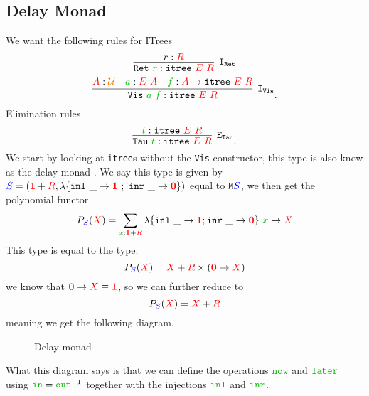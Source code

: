 \documentclass[twoside,11pt,openright]{report}
\newcommand*{\term}[1]{\textcolor{green!70!black}{#1}}
\newcommand*{\type}[1]{\textcolor{red}{#1}}
\newcommand*{\container}[1]{\textcolor{blue}{#1}}
\newcommand*{\universe}[1]{\textcolor{orange}{#1}}
\newcommand*{\unit}{\type{\textbf{1}}}
\newcommand*{\empt}{\type{\textbf{0}}}
\begin{document}
\subsection{Delay Monad}
We want the following rules for ITrees
\begin{equation}
  \infer [\mathtt{I}_\mathtt{Ret}]{\mathtt{Ret}~\term{r} : \mathtt{itree}~\type{E}~\type{R}}{r : \type{R}}
\end{equation}
\begin{equation}
  \infer[\mathtt{I}_\mathtt{Vis}]{\mathtt{Vis}~\term{a}~\term{f} : \mathtt{itree}~\type{E}~\type{R}}{\type{A} : \universe{\mathcal{U}} & \term{a} : \type{E}~\type{A} & \term{f} : \type{A} \rightarrow \texttt{itree}~\type{E}~\type{R}}.
\end{equation}
Elimination rules
\begin{equation}
  \infer[\mathtt{E}_\mathtt{Tau}]{\mathtt{Tau}~\term{t} : \mathtt{itree}~\type{E}~\type{R}}{\term{t} : \mathtt{itree}~\type{E}~\type{R}}.
\end{equation}
We start by looking at \texttt{itree}s without the \texttt{Vis} constructor, this type is also know as the delay monad . We say this type is given by \(\container{S} = (\unit + \type{R},\lambda \{ \texttt{inl}~\_ \rightarrow \unit~;~\texttt{inr}~\_ \rightarrow \empt \})\) equal to \(\mathtt{M}\container{S}\), we then get the polynomial functor
\begin{equation}
  P_{\container{S}}(\type{X}) = \sum_{\term{x} : \unit + \type{R}} \lambda \{ \texttt{inl}~\_ \rightarrow \unit ; \texttt{inr}~\_ \rightarrow \empt\}~\term{x} \rightarrow \type{X}
\end{equation}
This type is equal to the type:
\begin{equation}
  P_{\container{S}}(\type{X}) = \type{X} + \type{R} \times (\empt \rightarrow \type{X})
\end{equation}
we know that \(\empt \rightarrow \type{X} \equiv \unit\), so we can further reduce to
\begin{equation}
  P_{\container{S}}(\type{X}) = \type{X} + \type{R}
\end{equation}
meaning we get the following diagram.
\begin{figure}[h]
  \centering
  \caption{Delay monad}
\end{figure}
What this diagram says is that we can define the operations \(\term{\mathtt{now}}\) and \(\term{\mathtt{later}}\) using \(\term{\mathtt{in}} = \term{\mathtt{out}}^{-1}\) together with the injections \(\term{\mathtt{inl}}\) and \(\term{\mathtt{inr}}\). 
\end{document}
